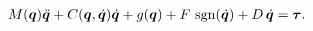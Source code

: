 ﻿\begin{align}
  M(\bm{q})\ddot{\bm{q}} + C(\bm{q},\dot{\bm{q}})\dot{\bm{q}} + g(\bm{q})
  + F\,\operatorname{sgn}(\dot{\bm{q}}) + D\,\dot{\bm{q}} = \bm{\tau}.
\end{align}
